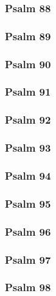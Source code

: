 \documentclass[12pt]{extarticle}
\begin{document}
\begin{multicols}{2}
\subsubsection{Psalm 88}

\newpage

\subsubsection{Psalm 89}

\newpage

\subsubsection{Psalm 90}

\newpage

\subsubsection{Psalm 91}

\newpage

\subsubsection{Psalm 92}

\newpage

\subsubsection{Psalm 93}

\newpage

\subsubsection{Psalm 94}

\newpage

\subsubsection{Psalm 95}

\newpage

\subsubsection{Psalm 96}

\newpage

\subsubsection{Psalm 97}

\newpage

\subsubsection{Psalm 98}

\newpage


\end{multicols}
\end{document}
